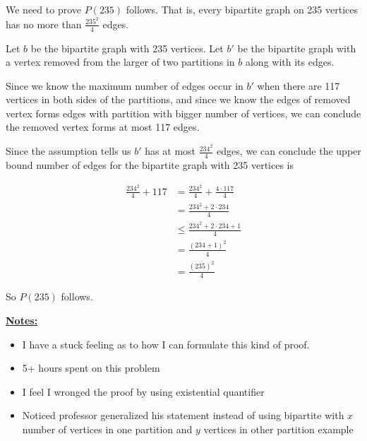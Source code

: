 \documentclass[12pt]{article}
\begin{document}
\begin{enumerate}[a.]
\begin{mdframed}
        \bigskip

        We need to prove $P(235)$ follows. That is, every bipartite graph on 235
        vertices has no more than $\frac{235^2}{4}$ edges.

        \bigskip

        Let $b$ be the bipartite graph with 235 vertices. Let $b'$ be the bipartite
        graph with a vertex removed from the larger of two partitions in $b$ along with its edges.

        \bigskip

        Since we know the maximum number of edges occur in $b'$ when there are
        117 vertices in both sides of the partitions, and since we know the edges
        of removed vertex forms edges with partition with bigger number of vertices,
        we can conclude the removed vertex forms at most 117 edges.

        \bigskip

        Since the assumption tells us $b'$ has at most $\frac{234^2}{4}$ edges,
        we can conclude the upper bound number of edges for the bipartite
        graph with 235 vertices is


        \begin{align}
            \frac{234^2}{4} + 117 &= \frac{234^2}{4} + \frac{4 \cdot 117}{4}\\
            &= \frac{234^2 + 2 \cdot 234}{4}\\
            &\leq \frac{234^2 + 2 \cdot 234 + 1}{4}\\
            &= \frac{(234+1)^2}{4}\\
            &= \frac{(235)^2}{4}
        \end{align}

        \bigskip

        So $P(235)$ follows.

    \end{mdframed}

    \bigskip

    \underline{\textbf{Notes:}}

    \bigskip

    \begin{itemize}
        \item I have a stuck feeling as to how I can formulate this kind of proof.
        \item 5+ hours spent on this problem
        \item I feel I wronged the proof by using existential quantifier
        \item Noticed professor generalized his statement instead of using bipartite
        with $x$ number of vertices in one partition and $y$ vertices in other partition
        example


\end{itemize}
\end{enumerate}
\end{document}
